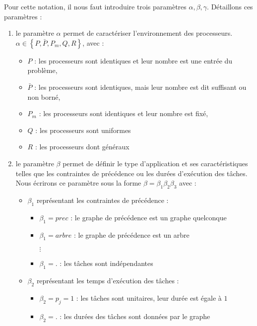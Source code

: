 \documentclass[a4paper,11pt]{article}
\begin{document}
Pour cette notation, il nous faut introduire trois paramètres $\alpha, \beta, \gamma$. Détaillons
ces paramètres :
\begin{enumerate}
    \item le paramètre $\alpha$ permet de caractériser l'environnement des processeurs. $\alpha \in
        \left\{ P, \bar{P}, P_m, Q, R \right\}$, avec :
        \begin{itemize}
            \item $P$ : les processeurs sont identiques et leur nombre est une entrée du problème,
            \item $\bar{P}$ : les processeurs sont identiques, mais leur nombre est dit suffisant ou
                non borné,
            \item $P_m$ : les processeurs sont identiques et leur nombre est fixé,
            \item $Q$ : les processeurs sont uniformes
            \item $R$ : les processeurs dont généraux
        \end{itemize}
    \item le paramètre $\beta$ permet de définir le type d'application et ses caractéristiques
        telles que les contraintes de précédence ou les durées d'exécution des tâches. Nous écrirons
        ce paramètre sous la forme $\beta = \beta_1\beta_2\beta_3$ avec :
        \begin{itemize}[label=$\bullet$]
            \item $\beta_1$ représentant les contraintes de précédence :
                \begin{itemize}
                    \item $\beta_1 = prec$ : le graphe de précédence est un graphe quelconque
                    \item $\beta_1 = arbre$ : le graphe de précédence est un arbre
                    \item[$\vdots$]
                    \item $\beta_1 = .$ : les tâches sont indépendantes
                \end{itemize}
            \item $\beta_2$ représentant les temps d'exécution des tâches :
                \begin{itemize}
                    \item $\beta_2 = p_j = 1$ : les tâches sont unitaires, leur durée est égale à
                        $1$
                    \item $\beta_2 = .$ : les durées des tâches sont données par le graphe

\end{itemize}
\end{itemize}
\end{enumerate}
\end{document}
